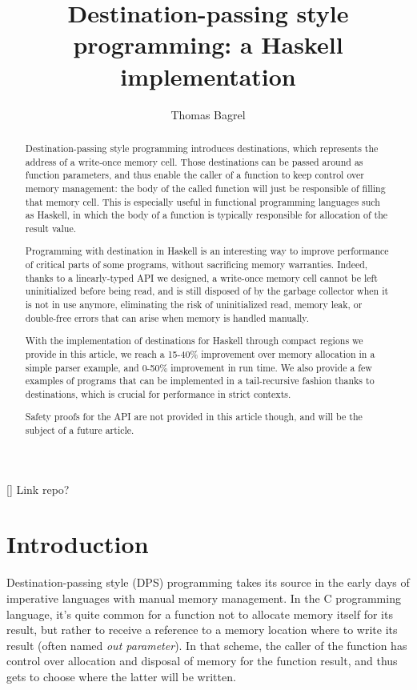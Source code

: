 \documentclass[english]{jflart}
\title{Destination-passing style programming: a Haskell implementation}
\author[1]{Thomas Bagrel}
\affil[1]{INRIA/LORIA, Vand\oe{}uvre-lès-Nancy, 54500, France}
\affil[1]{TWEAG, Paris, 75012, France}
\newcommand{\TODO}[1]{{\color{red}\large #1}}
\begin{document}
\maketitle

\begin{abstract}
Destination-passing style programming introduces destinations, which represents the address of a write-once memory cell. Those destinations can be passed around as function parameters, and thus enable the caller of a function to keep control over memory management: the body of the called function will just be responsible of filling that memory cell. This is especially useful in functional programming languages such as Haskell, in which the body of a function is typically responsible for allocation of the result value.

Programming with destination in Haskell is an interesting way to improve performance of critical parts of some programs, without sacrificing memory warranties. Indeed, thanks to a linearly-typed API we designed, a write-once memory cell cannot be left uninitialized before being read, and is still disposed of by the garbage collector when it is not in use anymore, eliminating the risk of uninitialized read, memory leak, or double-free errors that can arise when memory is handled manually.

With the implementation of destinations for Haskell through compact regions we provide in this article, we reach a 15-40\% improvement over memory allocation in a simple parser example, and 0-50\% improvement in run time. We also provide a few examples of programs that can be implemented in a tail-recursive fashion thanks to destinations, which is crucial for performance in strict contexts.

Safety proofs for the API are not provided in this article though, and will be the subject of a future article.
\end{abstract}

\tableofcontents{}

\TODO{[] Link repo?}\\

\section{Introduction}

Destination-passing style (DPS) programming takes its source in the early days of imperative languages with manual memory management. In the C programming language, it's quite common for a function not to allocate memory itself for its result, but rather to receive a reference to a memory location where to write its result (often named \emph{out parameter}). In that scheme, the caller of the function has control over allocation and disposal of memory for the function result, and thus gets to choose where the latter will be written.
\end{document}
